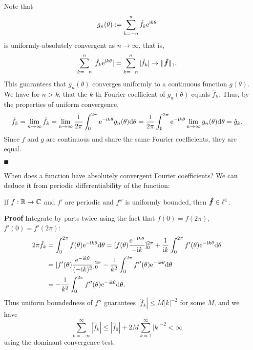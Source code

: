Note that
\[
g_n(\theta) := \sum_{k = -n}^n \hat f_k {\rm e}^{{\rm i} k \theta}
\]
is uniformly-absolutely convergent as $n \ensuremath{\rightarrow} \ensuremath{\infty}$, that is,
\[
\sum_{k = -n}^n |\hat f_k {\rm e}^{{\rm i} k \theta}| = \sum_{k = -n}^n |\hat f_k| \rightarrow \|{\mbox{\boldmath$\hat f$\unboldmath}}\|_1.
\]
This guarantees that $g_n(\ensuremath{\theta})$ converges uniformly to a continuous function $g(\ensuremath{\theta})$. We have for $n > k$, that the $k$-th Fourier coefficient of $g_n(\ensuremath{\theta})$ equals $\hat f_k$. Thus, by the properties of uniform convergence,
\[
\hat f_k = \lim_{n \rightarrow \infty} \hat f_k =  \lim_{n \rightarrow \infty} {1 \over 2\pi} \int_0^{2\pi}  {\rm e}^{-{\rm i} k \theta} g_n(\theta) {\rm d}\theta =
 {1 \over 2\pi} \int_0^{2\pi}  {\rm e}^{-{\rm i} k \theta} \lim_{n \rightarrow \infty} g_n(\theta) {\rm d}\theta = \hat g_k.
\]
Since $f$ and $g$ are continuous and share the same Fourier coefficients, they are equal.

\ensuremath{\QED}

When does a function have absolutely convergent Fourier coefficients? We can deduce it from periodic differentiability of the function:

\begin{lemma} If $f : {\mathbb R} \rightarrow {\mathbb C}$ and $f'$ are periodic  and $f''$ is uniformly bounded, then ${\mbox{\boldmath$\hat f$\unboldmath}} \in \ell^1$.

\end{lemma}
\textbf{Proof} Integrate by parts twice using the fact that $f(0) = f(2\ensuremath{\pi})$, $f'(0) = f'(2\ensuremath{\pi})$:
\begin{align*}
2\pi\hat f_k &= \int_0^{2\pi} f(\theta) {\rm e}^{-{\rm i} k \theta} {\rm d}\theta =
[f(\theta) {{\rm e}^{-{\rm i} k \theta} \over -{\rm i} k}]_0^{2\pi} + {1 \over {\rm i} k} \int_0^{2\pi} f'(\theta) {\rm e}^{-{\rm i} k \theta} {\rm d}\theta \\
&=  [f'(\theta) {{\rm e}^{-{\rm i} k \theta} \over (-{\rm i} k)^2 }]_0^{2\pi} - {1 \over k^2} \int_0^{2\pi} f''(\theta) {\rm e}^{-{\rm i} k \theta} {\rm d}\theta \\
&= - {1 \over k^2} \int_0^{2\pi} f''(\theta) {\rm e}^{-{\rm i} k \theta} {\rm d}\theta.
\end{align*}
Thus uniform boundedness of $f''$ guarantees $|\hat f_k| \ensuremath{\leq} M |k|^{-2}$ for some $M$, and we have
\[
\ensuremath{\sum}_{k = -\ensuremath{\infty}}^\ensuremath{\infty} |\hat f_k| \ensuremath{\leq} |\hat f_0|  + 2M \ensuremath{\sum}_{k = 1}^\ensuremath{\infty} |k|^{-2}  < \ensuremath{\infty}
\]
using the dominant convergence test.

